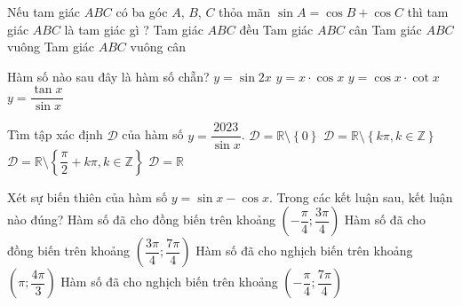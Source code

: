 \begin{ex}%
Nếu tam giác $ABC$ có ba góc $A$, $B$, $C$ thỏa mãn $\sin A=\cos B+\cos C$ thì tam giác $ABC$ là tam giác gì ?
	\choice
	{Tam giác $ABC$ đều}
	{Tam giác $ABC$ cân}
	{\True Tam giác $ABC$ vuông}
	{Tam giác $ABC$ vuông cân}
\end{ex}
\begin{ex}%
	Hàm số nào sau đây là hàm số chẵn?
	\choice
	{$y=\sin 2x$}
	{$y= x \cdot \cos x$}
	{$y=\cos x \cdot \cot x$}
	{\True $y=\dfrac{\tan x}{\sin x}$}
\end{ex}
\begin{ex}%
Tìm tập xác định $\mathscr{D}$ của hàm số $y=\dfrac{2023}{\sin x}$.
	\choice
	{$\mathscr{D} = \mathbb{R} \setminus \left\{ 0 \right\}$}
	{\True $\mathscr{D} = \mathbb{R} \setminus \left\{ k \pi, k\in \mathbb{Z} \right\}$}
	{$\mathscr{D} = \mathbb{R} \setminus \left\{ \dfrac{\pi}{2} + k \pi, k\in \mathbb{Z} \right\}$}
	{$\mathscr{D} = \mathbb{R}$}
\end{ex}
\begin{ex}%
Xét sự biến thiên của hàm số $y=\sin x-\cos x$. Trong các kết luận sau, kết luận nào đúng?
	\choice
	{\True Hàm số đã cho đồng biến trên khoảng $\left(-\dfrac{\pi}{4} ; \dfrac{3 \pi}{4}\right)$}
	{Hàm số đã cho đồng biến trên khoảng $\left(\dfrac{3 \pi}{4} ; \dfrac{7 \pi}{4}\right)$}
	{Hàm số đã cho nghịch biến trên khoảng $\left(\pi ; \dfrac{4 \pi}{3}\right)$}
	{Hàm số đã cho nghịch biến trên khoảng $\left(-\dfrac{\pi}{4} ; \dfrac{7 \pi}{4}\right)$}
	\loigiai{
		
	}
\end{ex}
